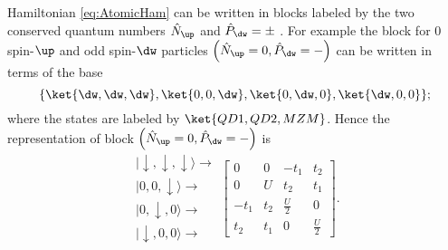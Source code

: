 Hamiltonian \eqref{eq:AtomicHam} can be written in blocks labeled by the  two conserved quantum numbers $\hat{N}_\up $ and $\hat{P}_\dw = \pm$ . For example the block  for $0$ spin-$\up$  and odd spin-$\dw$ particles  $\left( \hat{N}_\up =0, \hat{P}_\dw = - \right)$ can be written in terms of the base 
    \begin{equation}
        \lbrace \ket{\dw,\dw,\dw} , \ket{0,0,\dw} , \ket{0,\dw,0}, \ket{\dw,0,0}     \rbrace;
    \end{equation}
where the states are labeled by  $\ket{QD1,QD2,MZM}$. Hence the representation of block     $\left( \hat{N}_\up =0, \hat{P}_\dw = - \right)$ is 
    \begin{equation}
    \begin{array}{c}
        \vert\downarrow,\downarrow,\downarrow\rangle\rightarrow\\
        \vert0,0,\downarrow\rangle\rightarrow\\
        \vert0,\downarrow,0\rangle\rightarrow\\
        \vert\downarrow,0,0\rangle\rightarrow
        \end{array}\left[\begin{array}{cccc}
        0 & 0 & -t_1 & t_2\\
        0 & U & t_2 & t_1\\
        -t_1 & t_2 & \frac{U}{2} & 0\\
        t_2 & t_1 & 0 & \frac{U}{2}
    \end{array}\right].
    \end{equation}

